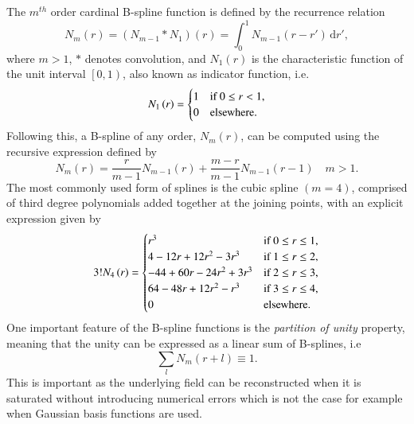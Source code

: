 \documentclass[review,authoryear,3p]{elsarticle}
\begin{document}
The $m^{th}$  order cardinal B-spline function is defined by the recurrence relation \citep{Chui1992} 
\begin{equation}
N_{m}\left(r\right) = \left(N_{m-1}\ast N_{1}\right)\left(r\right) = \int_0^{1} N_{m-1}\left( r-r'\right)\,\mathrm{d}r',
\label{SplineConvolutionIntegral}
\end{equation}
where $m>1$, $\ast$ denotes convolution, and $N_1\left(r\right)$ is the characteristic function of the unit interval $\left[ 0,1\right)$, also known as indicator function, i.e.
\begin{equation}
N_{1}\left(r\right)=
\begin{cases}
1 & \text{if $ 0\le r<1$}, \\
0 & \mathrm{elsewhere}.
\end{cases}
\end{equation}
Following this, a B-spline of any order, $N_m(r)$, can be computed using the recursive expression defined by \citet{DeBoor2001}
\begin{equation}\label{eq:MRA-DoBoorFormula}
 N_{m}\left(r\right)=\frac{r}{m-1}N_{m-1}\left(r\right)+\frac{m-r}{m-1}N_{m-1}\left(r-1\right) \quad m>1.
 \end{equation}
The most commonly used form of splines is the cubic spline $\left(m=4\right)$, comprised of third degree polynomials added together at the joining points, with an explicit expression given by
\begin{align}
3!N_{4}\left(r\right)=
\begin{cases}
r^3 & \text{if $ 0\le r\le1$}, \\
4-12r+12r^2-3r^3 & \text{if $1\le r\le2$}, \\
-44+60r-24r^2+3r^3 & \text{if $2\le r\le3$}, \\
64-48r+12r^2-r^3 & \text{if $3\le r\le4$}, \\
0 & \mathrm{elsewhere}.
\end{cases}
\end{align}
One important feature of the B-spline functions is the \emph{partition of unity} property, meaning that the unity can be expressed as a linear sum of B-splines, i.e
\begin{equation}
	\sum_{l}N_m(r+l)\equiv1.
	\end{equation}
This is important as the underlying field can be reconstructed when it is saturated without introducing numerical errors which is not the case for example when Gaussian basis functions are used.
	
\end{document}
